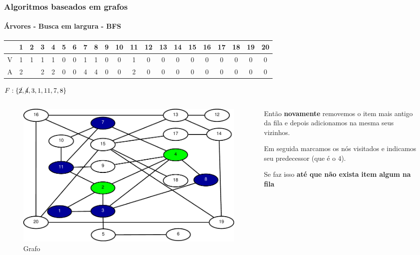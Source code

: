 \begin{frame}
	\frametitle{Algoritmos baseados em grafos}
	\framesubtitle{Árvores - Busca em largura - BFS}
	\setlength{\tabcolsep}{0.5em}
	\begin{tabular}{|c|c|c|c|c|c|c|c|c|c|c|c|c|c|c|c|c|c|c|c|c|}
		\hline
		\rule[0ex]{0pt}{0ex}&1&2&3&4&5&6&7&8&9&10&11&12&13&14&15&16&17&18&19&20 \\
		\hline
		\rule[0ex]{0pt}{0ex}V&1&1&1&1&0&0&1&1&0&0&1&0&0&0&0&0&0&0&0&0 \\
		\hline
		\rule[0ex]{0pt}{0ex}A&2& &2&2&0&0&4&4&0&0&2&0&0&0&0&0&0&0&0&0 \\
		\hline
	\end{tabular}
	\par $F:\{\cancel{2},\cancel{4},3,1,11,7,8\}$
	\begin{columns}
		\begin{column}{0.5\textwidth}
			\begin{figure}
				\centering
				\includegraphics[width=\linewidth]{images/buscaEmLargura02}
				\caption{Grafo}
				\label{fig:buscaemlargura03}
			\end{figure}
		\end{column}
		\begin{column}{0.5\textwidth}
			\par Então \textbf{novamente} removemos o item mais antigo da fila e depois adicionamos na mesma seus vizinhos.
			\par Em seguida marcamos os nós visitados e indicamos seu predecessor (que é o $4$).
			\par Se faz isso \textbf{até que não exista item algum na fila}
		\end{column}
	\end{columns}
\end{frame}

